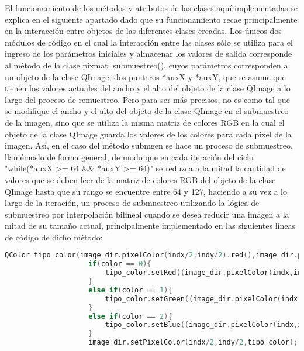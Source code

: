 \documentclass{article}
\begin{document}
El funcionamiento de los métodos y atributos de las clases aquí implementadas se explica en el siguiente apartado dado que su funcionamiento recae principalmente en la interacción entre objetos de las diferentes clases creadas. Los únicos dos módulos de código en el cual la interacción entre las clases sólo se utiliza para el ingreso de los parámetros iniciales y almacenar los valores de salida corresponde al método de la clase pixmat: submuestreo(), cuyos parámetros corresponden a un objeto de la clase QImage, dos punteros *auxX y *auxY, que se asume que tienen los valores actuales del ancho y el alto del objeto de la clase QImage a lo largo del proceso de remuestreo. Pero para ser más precisos, no es como tal que se modifique el ancho y el alto del objeto de la clase QImage en el submuestreo de la imagen, sino que se utiliza la misma matriz de colores RGB en la cual el objeto de la clase QImage guarda los valores de los colores para cada pixel de la imagen. Así, en el caso del método submgen se hace un proceso de submuestreo, llamémoslo de forma general, de modo que en cada iteración del ciclo "while(*auxX >= 64 && *auxY >= 64)" se reduzca a la mitad la cantidad de valores que se deben leer de la matriz de colores RGB del objeto de la clase QImage hasta que su rango se encuentre entre 64 y 127, haciendo a su vez a lo largo de la iteración, un proceso de submuestreo utilizando la lógica de submuestreo por interpolación bilineal cuando se desea reducir una imagen a la mitad de su tamaño actual, principalmente implementado en las siguientes líneas de código de dicho método:
\begin{lstlisting}[language=C++, label=metodopixmat_submgen_interpolacionbilineal]
                    QColor tipo_color(image_dir.pixelColor(indx/2,indy/2).red(),image_dir.pixelColor(indx/2,indy/2).green(),image_dir.pixelColor(indx/2,indy/2).blue());
                    if(color == 0){
                        tipo_color.setRed((image_dir.pixelColor(indx,indy).red() + image_dir.pixelColor(indx+1,indy).red() + image_dir.pixelColor(indx,indy+1).red() + image_dir.pixelColor(indx+1,indy+1).red())/4);
                    }
                    else if(color == 1){
                        tipo_color.setGreen((image_dir.pixelColor(indx,indy).green() + image_dir.pixelColor(indx+1,indy).green() + image_dir.pixelColor(indx,indy+1).green() + image_dir.pixelColor(indx+1,indy+1).green())/4);
                    }
                    else if(color == 2){
                        tipo_color.setBlue((image_dir.pixelColor(indx,indy).blue() + image_dir.pixelColor(indx+1,indy).blue() + image_dir.pixelColor(indx,indy+1).blue() + image_dir.pixelColor(indx+1,indy+1).blue())/4);
                    }
                    image_dir.setPixelColor(indx/2,indy/2,tipo_color);
\end{lstlisting}
\end{document}
